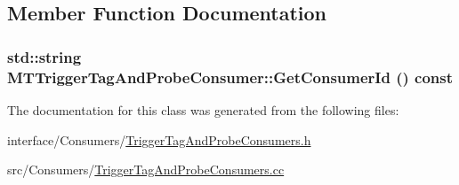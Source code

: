 \subsection{Member Function Documentation}
\hypertarget{classMTTriggerTagAndProbeConsumer_a21da9610ba61db42e78ed35560047ed9}{
\subsubsection[{GetConsumerId}]{\setlength{\rightskip}{0pt plus 5cm}std::string MTTriggerTagAndProbeConsumer::GetConsumerId () const}}
\label{classMTTriggerTagAndProbeConsumer_a21da9610ba61db42e78ed35560047ed9}


The documentation for this class was generated from the following files:\begin{DoxyCompactItemize}
\item 
interface/Consumers/\hyperlink{TriggerTagAndProbeConsumers_8h}{TriggerTagAndProbeConsumers.h}\item 
src/Consumers/\hyperlink{TriggerTagAndProbeConsumers_8cc}{TriggerTagAndProbeConsumers.cc}\end{DoxyCompactItemize}
